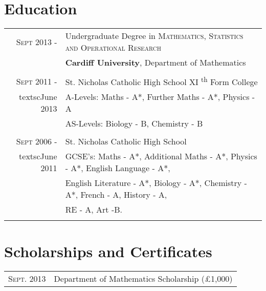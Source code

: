 \documentclass[a4paper,10pt]{article} %
\begin{document}
\section{Education}
\begin{tabular}{rl}

\textsc{Sept} 2013 - & Undergraduate Degree in \textsc{}\textsc{Mathematics, Statistics and Operational Research} \\
&\normalsize\textbf{Cardiff University}, Department of Mathematics\\
\\
\textsc{Sept} 2011 - & St. Nicholas Catholic High School XI \textsuperscript{th} Form College\\
textsc{June} 2013 & A-Levels: Maths - A*, Further Maths - A*, Physics - A\\
& AS-Levels: Biology - B, Chemistry - B\\
\\
\textsc{Sept} 2006 - & St. Nicholas Catholic High School\\
textsc{June} 2011 & GCSE's: Maths - A*, Additional Maths - A*, Physics - A*, English Language - A*,\\
& English Literature - A*, Biology - A*, Chemistry - A*, French - A, History - A,\\
& RE - A, Art -B.\\
\\

\end{tabular}


\section{Scholarships and Certificates}

\begin{tabular}{rl}
\textsc{Sept.} 2013 & Department of Mathematics Scholarship (\pounds1,000)\\


\end{tabular}

\end{document}
